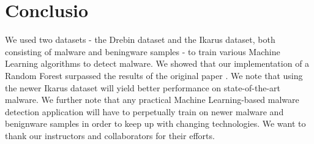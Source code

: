 \section{Conclusio}
We used two datasets - the Drebin dataset and the Ikarus dataset, both consisting of malware and beningware samples - to train various Machine Learning algorithms to detect malware. We showed that our implementation of a Random Forest surpassed the results of the original paper \cite{drebin}. We note that using the newer Ikarus dataset will yield better performance on state-of-the-art malware. We further note that any practical Machine Learning-based malware detection application will have to perpetually train on newer malware and benignware samples in order to keep up with changing technologies. We want to thank our instructors and collaborators for their efforts.